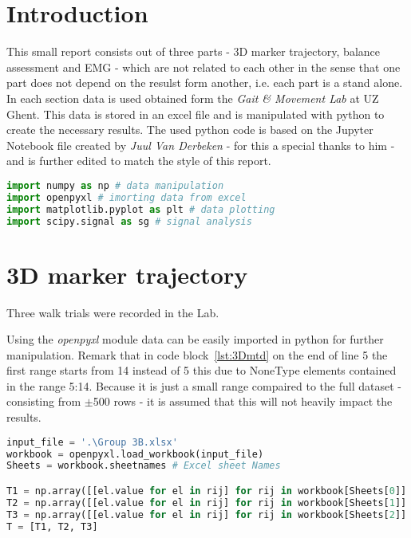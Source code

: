 \documentclass[english, a4paper, 11pt]{article}
\begin{document}


\section{Introduction}

    This small report consists out of three parts - 3D marker trajectory, balance assessment and EMG - which 
    are not related to each other in the sense that one part does not depend on the resulst form another, i.e. each part is a stand alone.\\

    In each section data is used obtained form the \emph{Gait \& Movement Lab} at UZ Ghent. This data is stored in an excel file
    and is manipulated with python to create the necessary results. The used python code is based on the Jupyter Notebook file created by \emph{Juul Van Derbeken} 
    - for this a special thanks to him - and is further edited to match the style of this report.

    \begin{lstlisting}[language=Python, caption=imported python modules]
import numpy as np # data manipulation
import openpyxl # imorting data from excel
import matplotlib.pyplot as plt # data plotting
import scipy.signal as sg # signal analysis
    \end{lstlisting}

\section{3D marker trajectory}

    Three walk trials were recorded in the Lab.

    Using the \emph{openpyxl} module data can be easily imported in python for further manipulation. 
    Remark that in code block~\ref*{lst:3Dmtd} on the end of line 5 the first range starts from 14 instead of 5 this due 
    to NoneType elements contained in the range 5:14. Because it is just a small range compaired to the full dataset - consisting 
    from $\pm$500 rows - it is assumed that this will not heavily impact the results.

    \begin{lstlisting}[language=Python, caption=importing 3D marker trajectory data, label=lst:3Dmtd]
input_file = '.\Group 3B.xlsx'
workbook = openpyxl.load_workbook(input_file)
Sheets = workbook.sheetnames # Excel sheet Names

T1 = np.array([[el.value for el in rij] for rij in workbook[Sheets[0]].rows])[14:,2:].T #First Trial, None values for rows < 14
T2 = np.array([[el.value for el in rij] for rij in workbook[Sheets[1]].rows])[5:,2:].T #Second Trial
T3 = np.array([[el.value for el in rij] for rij in workbook[Sheets[2]].rows])[5:,2:].T #Third Trial
T = [T1, T2, T3]
    \end{lstlisting}
\end{document}
